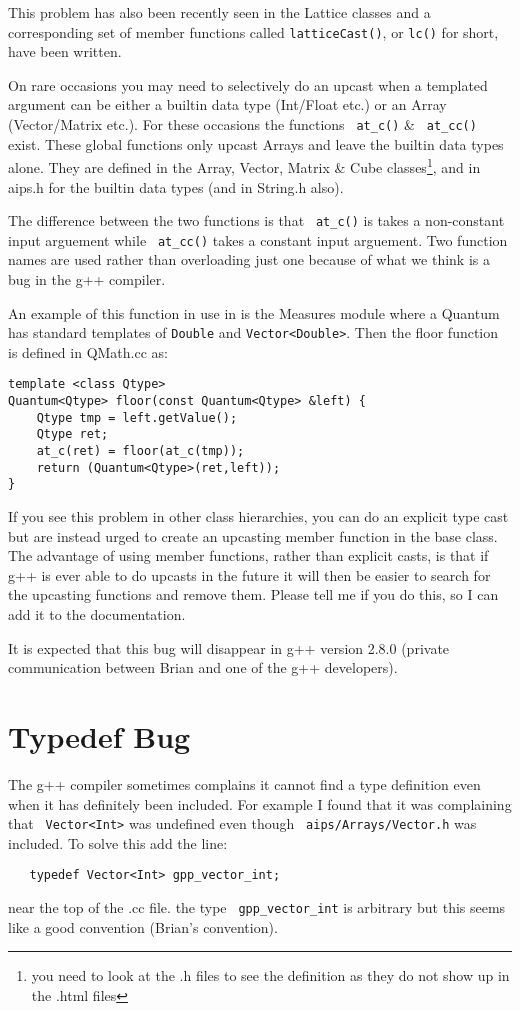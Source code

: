This problem has also been recently seen in the Lattice classes and a
corresponding set of member functions called \texttt{latticeCast()}, or
\texttt{lc()} for short, have been written. 

On rare occasions you may need to selectively do an upcast when a templated
argument can be either a builtin data type (Int/Float etc.) or an Array
(Vector/Matrix etc.). For these occasions the functions \texttt{ at\_c()} \&
\texttt{ at\_cc()} exist. These global functions only upcast Arrays and
leave the builtin data types alone. They are defined in the
Array, Vector, Matrix \& Cube classes\footnote{you need to look at the .h
  files to see the definition as they do not show up in the .html files},
and in aips.h for the builtin data types (and in String.h also). 

The difference between the two functions is that \texttt{ at\_c()} is takes
a non-constant input arguement while \texttt{ at\_cc()} takes a constant
input arguement. Two function names are used rather than overloading just
one because of what we think is a bug in the g++ compiler. 

An example of this function in use in is the Measures module where a Quantum
has standard templates of \texttt{Double} and \texttt{Vector<Double>}. Then
the floor function is defined in QMath.cc as:
\begin{verbatim}
template <class Qtype>
Quantum<Qtype> floor(const Quantum<Qtype> &left) {
    Qtype tmp = left.getValue(); 
    Qtype ret;
    at_c(ret) = floor(at_c(tmp));
    return (Quantum<Qtype>(ret,left));
}
\end{verbatim}

If you see this problem in other class hierarchies, you can do an explicit
type cast but are instead urged to create an upcasting member function in
the base class. The advantage of using member functions, rather than
explicit casts, is that if g++ is ever able to do upcasts in the future it
will then be easier to search for the upcasting functions and remove
them. Please tell me if you do this, so I can add it to the documentation. 

It is expected that this bug will disappear in g++ version 2.8.0 (private
communication between Brian and one of the g++ developers).

\section{Typedef Bug\label{sec:typedef} }   
The g++ compiler sometimes complains it cannot
find a type definition even when it has definitely been included. For
example I found that it was complaining that \texttt{ Vector<Int>} was
undefined even though \texttt{ aips/Arrays/Vector.h} was included. To
solve this add the line:
\begin{verbatim}
   typedef Vector<Int> gpp_vector_int;
\end{verbatim}
near the top of the .cc file. the type \texttt{ gpp\_vector\_int} is
arbitrary but this seems like a good convention (Brian's convention).
   
